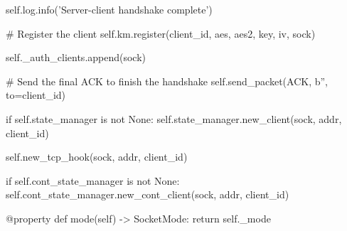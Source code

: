 \begin{pythoncode}
        self.log.info('Server-client handshake complete')

        # Register the client
        self.km.register(client_id, aes, aes2, key, iv, sock)

        self._auth_clients.append(sock)

        # Send the final ACK to finish the handshake
        self.send_packet(ACK, b'', to=client_id)

        if self.state_manager is not None:
            self.state_manager.new_client(sock, addr, client_id)

        self.new_tcp_hook(sock, addr, client_id)

        if self.cont_state_manager is not None:
            self.cont_state_manager.new_cont_client(sock, addr, client_id)

    @property
    def mode(self) -> SocketMode:
        return self._mode
\end{pythoncode}
